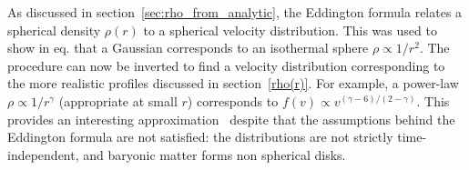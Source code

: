 \smallskip

As discussed in section~\ref{sec:rho_from_analytic}, 
the Eddington formula relates a spherical density $\rho(r)$ to a spherical velocity distribution.
This was used to show in eq. that a Gaussian corresponds to an isothermal sphere $\rho \propto 1/r^2$.
The procedure can now be inverted to find a velocity distribution corresponding to the more realistic profiles discussed in section~\ref{rho(r)}.
For example, a power-law 
$\rho \propto 1/r^{\gamma}$ (appropriate at small $r$) 
corresponds to $f(v) \propto v^{(\gamma-6)/(2-\gamma)}$.
This provides an interesting approximation~\cite{AnalyticalHM} despite that
the assumptions behind the Eddington formula are not satisfied:
the distributions are not strictly time-independent, and baryonic matter forms non spherical disks.


\smallskip


